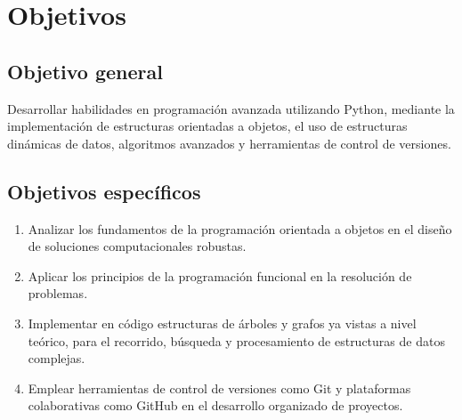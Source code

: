 \section{Objetivos}

\subsection*{Objetivo general}

Desarrollar habilidades en programación avanzada utilizando Python, mediante la implementación de estructuras orientadas a objetos, el uso de estructuras dinámicas de datos, algoritmos avanzados y herramientas de control de versiones.

\subsection*{Objetivos específicos}

\begin{enumerate}
  \item Analizar los fundamentos de la programación orientada a objetos en el diseño de soluciones computacionales robustas.
  \item Aplicar los principios de la programación funcional en la resolución de problemas.
  \item Implementar en código estructuras de árboles y grafos ya vistas a nivel teórico, para el recorrido, búsqueda y procesamiento de estructuras de datos complejas.
  \item Emplear herramientas de control de versiones como Git y plataformas colaborativas como GitHub en el desarrollo organizado de proyectos.
\end{enumerate}
